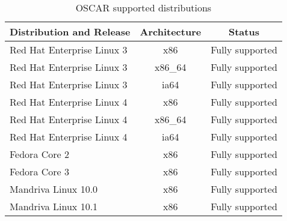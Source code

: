 %
%
%

\begin{table}[htbp]
  \begin{center}
    \begin{tabular}{|l|c|p{3in}|}
      \hline
      \multicolumn{1}{|c|}{Distribution and Release} &
      \multicolumn{1}{|c|}{Architecture} &
      \multicolumn{1}{|c|}{Status} \\
      \hline
      \hline
%
      Red Hat Enterprise Linux 3 & x86 & Fully supported \\
      Red Hat Enterprise Linux 3 & x86\_64 & Fully supported \\
      Red Hat Enterprise Linux 3 & ia64 & Fully supported \\
      Red Hat Enterprise Linux 4 & x86 & Fully supported \\
      Red Hat Enterprise Linux 4 & x86\_64 & Fully supported \\
      Red Hat Enterprise Linux 4 & ia64 & Fully supported \\
%
\hline
%
      Fedora Core 2 & x86 & Fully supported \\
      Fedora Core 3 & x86 & Fully supported \\
%
\hline
%
      Mandriva Linux 10.0 & x86 & Fully supported \\
      Mandriva Linux 10.1 & x86 & Fully supported \\
%
\hline
%
    \end{tabular}
    \caption{OSCAR supported distributions}
    \label{tab:oscar-distro-support}
  \end{center}
\end{table}
